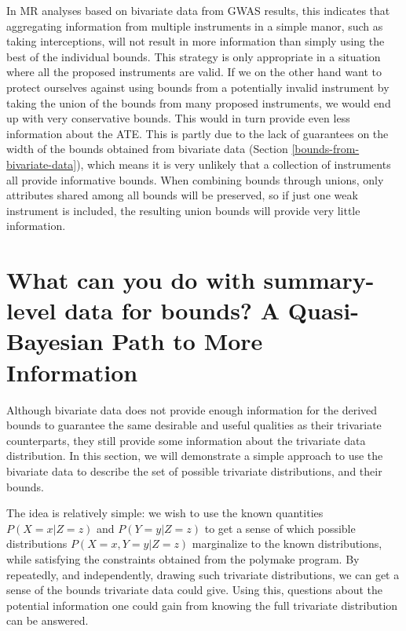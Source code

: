 \documentclass[
]{article}
\theoremstyle{plain}
\begin{document}
In MR analyses based on bivariate data from GWAS results, this indicates that aggregating information from multiple instruments in a simple manor, such as taking interceptions, will not result in more information than simply using the best of the individual bounds. This strategy is only appropriate in a situation where all the proposed instruments are valid. If we on the other hand want to protect ourselves against using bounds from a potentially invalid instrument by taking the union of the bounds from many proposed instruments, we would end up with very conservative bounds. This would in turn provide even less information about the ATE. This is partly due to the lack of guarantees on the width of the bounds obtained from bivariate data (Section \ref{bounds-from-bivariate-data}), which means it is very unlikely that a collection of instruments all provide informative bounds. When combining bounds through unions, only attributes shared among all bounds will be preserved, so if just one weak instrument is included, the resulting union bounds will provide very little information.

\hypertarget{what-can-you-do-with-summary-level-data-for-bounds-a-quasi-bayesian-path-to-more-information}{%
\section{What can you do with summary-level data for bounds? A Quasi-Bayesian Path to More Information}\label{what-can-you-do-with-summary-level-data-for-bounds-a-quasi-bayesian-path-to-more-information}}

\label{quasi-bayesian}

Although bivariate data does not provide enough information for the derived bounds to guarantee the same desirable and useful qualities as their trivariate counterparts, they still provide some information about the trivariate data distribution. In this section, we will demonstrate a simple approach to use the bivariate data to describe the set of possible trivariate distributions, and their bounds.

The idea is relatively simple: we wish to use the known quantities \(P(X = x | Z = z)\) and \(P(Y = y | Z = z)\) to get a sense of which possible distributions \(P(X = x, Y = y | Z = z)\) marginalize to the known distributions, while satisfying the constraints obtained from the polymake program. By repeatedly, and independently, drawing such trivariate distributions, we can get a sense of the bounds trivariate data could give. Using this, questions about the potential information one could gain from knowing the full trivariate distribution can be answered.
\end{document}
